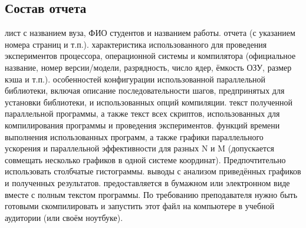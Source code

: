 \subsection{Состав отчета}
\begin{enumerate}
     лист с названием вуза, ФИО студентов и названием работы.
     отчета (с указанием номера страниц и т.п.).
     характеристика использованного для проведения экспериментов процессора, операционной системы и компилятора (официальное название, номер версии/модели, разрядность, число ядер, ёмкость ОЗУ, размер кэша и т.п.).
     особенностей конфигурации использованной параллельной библиотеки, включая описание последовательности шагов, предпринятых для установки библиотеки, и использованных опций компиляции.
     текст полученной параллельной программы, а также текст всех скриптов, использованных для компилирования программы и проведения экспериментов.
     функций времени выполнения использованных программ, а также графики параллельного ускорения и параллельной эффективности для разных N и M (допускается совмещать несколько графиков в одной системе координат). Предпочтительно использовать столбчатые гистограммы.
     выводы с анализом приведённых графиков и полученных результатов.
     предоставляется в бумажном или электронном виде вместе с полным текстом программы. По требованию преподавателя нужно быть готовыми скомпилировать и запустить этот файл на компьютере в учебной аудитории (или своём ноутбуке).
\end{enumerate}
